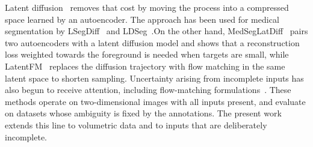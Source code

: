 Latent diffusion~\cite{ldm} removes that cost by moving the process into a
compressed space learned by an autoencoder. The approach has been used for
medical segmentation by LSegDiff~\cite{lsegdiff} and LDSeg~\cite{ldseg}.On the other hand, MedSegLatDiff~\cite{medseglatdiff} pairs two
autoencoders with a latent diffusion model and shows that a reconstruction
loss weighted towards the foreground is needed when targets are small, while
LatentFM~\cite{latentfm} replaces the diffusion trajectory with flow matching
in the same latent space to shorten sampling. Uncertainty arising from
incomplete inputs has also begun to receive attention, including flow-matching
formulations~\cite{nguyen2025aleatoric}. These methods operate on
two-dimensional images with all inputs present, and evaluate on datasets whose
ambiguity is fixed by the annotations. The present work extends this line to
volumetric data and to inputs that are deliberately incomplete.
